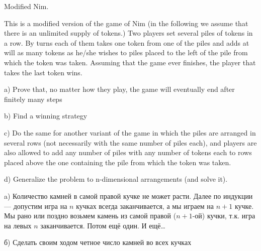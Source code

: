 \begin{problem}
 Modified Nim. \par
This is a modified version of the game of Nim (in the following we
assume that there is an unlimited supply of tokens.) Two players set several piles of
tokens in a row. By turns each of them takes one token from one of the piles and
adds at will as many tokens as he/she wishes to piles placed to the left of the pile
from which the token was taken. Assuming that the game ever finishes, the player
that takes the last token wins. \par
a) Prove that, no matter how they play, the game will eventually end after finitely
many steps \par
b) Find a winning strategy \par
c) Do the same for another variant of the game in which the piles are arranged in several rows (not necessarily with the same number of piles each), and players are also allowed to add any number of piles with any number of tokens each to rows placed above the one containing the pile from which the token was taken. \par
d) Generalize the problem to n-dimensional arrangements (and solve it).



\begin{sol}

a) Количество камней в самой правой кучке не может расти. Далее по индукции — допустим игра на $n$ кучках всегда заканчивается, а мы играем на $n+1$ кучке. Мы рано или поздно возьмем камень из самой правой ($n+1$-ой) кучки, т.к. игра на левых $n$ заканчивается. Потом ещё один. И ещё\ldots \par
б) Сделать своим ходом четное число камней во всех кучках
\end{sol}
\end{problem}



